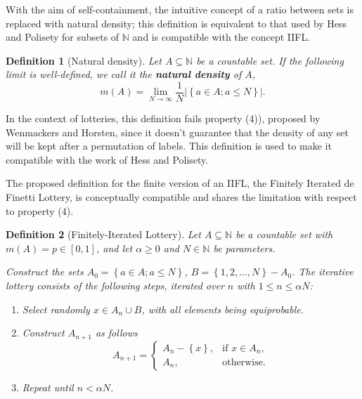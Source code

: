 \documentclass{article}
\newtheorem{definition}{Definition}
\newcommand{\N}{\mathbb{N}}
\newcommand{\card}[1]{\left| #1 \right|}
\newcommand{\sset}[1]{\left\{ #1 \right\}}
\newcommand{\ppar}[1]{\left( #1 \right)}
\begin{document}
With the aim of self-containment, the intuitive concept of a ratio between sets is replaced with natural density; this definition is equivalent to
that used by Hess and Polisety \cite{hess2023} for
subsets of $\N$ and is compatible with the concept IIFL.

\begin{definition}[Natural density]
Let $A \subseteq \N$ be a countable set.
If the following limit is well-defined, we call it the \textbf{natural density} of $A$,
\begin{equation}
    m\ppar{A} = 
    \lim_{N\rightarrow \infty} \frac{1}{N} \card{ \sset{a\in A; a\leq N} }.
\end{equation}
\end{definition}

In the context of lotteries, this definition fails property (4)), proposed by Wenmackers and Horsten, since it doesn't guarantee that the density of any set will be kept after a permutation of labels.
%
This definition is used to make it compatible with the work of Hess and Polisety.

The proposed definition for the finite version of an IIFL, the Finitely Iterated de Finetti Lottery, is conceptually compatible and shares the limitation with respect to property (4).

\begin{definition}[Finitely-Iterated Lottery]
Let $A \subseteq \N$ be a countable set with $m\ppar{A} = p \in [0,1]$, and let $\alpha\geq 0$ and $N\in \N$ be parameters. 

Construct the sets $A_0 = \sset{a\in A; a\leq N}$, $B = \sset{1, 2, \dots, N} - A_0$.
%
The iterative lottery consists of the following steps, iterated over $n$ with $1\leq n\leq \alpha N$:
\begin{enumerate}
    \item Select randomly $x \in A_n \cup B$, with all elements being equiprobable.
    \item Construct $A_{n+1}$ as follows
    \begin{equation}
        A_{n+1} = \begin{cases}
            A_n-\sset{x}, &\text{if } x\in A_n, \\
            A_n, &\text{otherwise}.
        \end{cases}
    \end{equation}
    \item Repeat until $n< \alpha N$.
\end{enumerate}
\end{definition}
\end{document}
